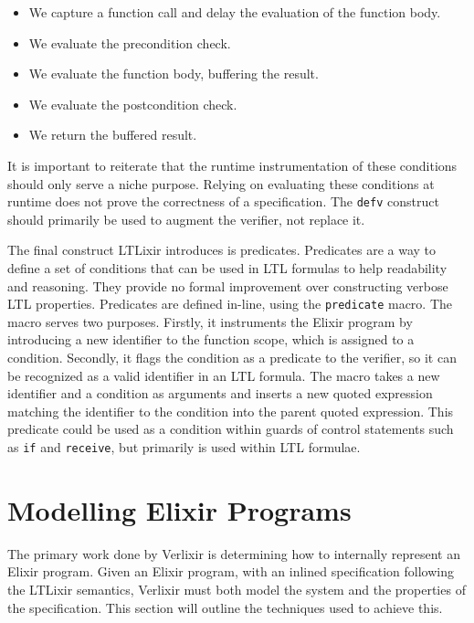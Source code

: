 \begin{itemize}
    \item We capture a function call and delay the evaluation of the function body.
    \item We evaluate the precondition check.
    \item We evaluate the function body, buffering the result.
    \item We evaluate the postcondition check.
    \item We return the buffered result.
\end{itemize}
It is important to reiterate that the runtime instrumentation of these conditions should only serve a niche purpose. Relying on evaluating these conditions at runtime does not prove the correctness of a specification. The \texttt{defv} construct should primarily be used to augment the verifier, not replace it.
\par
The final construct LTLixir introduces is predicates. Predicates are a way to define a set of conditions that can be used in LTL formulas to help readability and reasoning. They provide no formal improvement over constructing verbose LTL properties. Predicates are defined in-line, using the \texttt{predicate} macro. The macro serves two purposes. Firstly, it instruments the Elixir program by introducing a new identifier to the function scope, which is assigned to a condition. Secondly, it flags the condition as a predicate to the verifier, so it can be recognized as a valid identifier in an LTL formula. The macro takes a new identifier and a condition as arguments and inserts a new quoted expression matching the identifier to the condition into the parent quoted expression. This predicate could be used as a condition within guards of control statements such as \texttt{if} and \texttt{receive}, but primarily is used within LTL formulae.

\section{Modelling Elixir Programs} \label{sec:modelling_elixir_programs}
The primary work done by Verlixir is determining how to internally represent an Elixir program. Given an Elixir program, with an inlined specification following the LTLixir semantics, Verlixir must both model the system and the properties of the specification. This section will outline the techniques used to achieve this.

